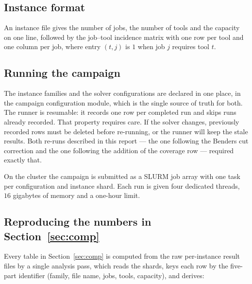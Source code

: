 \subsection{Instance format}\label{ssec:repro-format}

An instance file gives the number of jobs, the number of tools and the capacity on one
line, followed by the job--tool incidence matrix with one row per tool and one column
per job, where entry $(t,j)$ is $1$ when job $j$ requires tool $t$.

\subsection{Running the campaign}\label{ssec:repro-campaign}

The instance families and the solver configurations are declared in one place, in the
campaign configuration module, which is the single source of truth for both. The runner
is resumable: it records one row per completed run and skips runs already recorded. That
property requires care. If the solver changes, previously recorded rows must be deleted
before re-running, or the runner will keep the stale results. Both re-runs described in
this report --- the one following the Benders cut correction and the one following the
addition of the coverage row --- required exactly that.

On the cluster the campaign is submitted as a SLURM job array with one task per
configuration and instance shard. Each run is given four dedicated threads,
$16$ gigabytes of memory and a one-hour limit.

\subsection{Reproducing the numbers in Section~\ref{sec:comp}}\label{ssec:repro-numbers}

Every table in Section~\ref{sec:comp} is computed from the raw per-instance result
files by a single analysis pass, which reads the shards, keys each row by the
five-part identifier (family, file name, jobs, tools, capacity), and derives:

